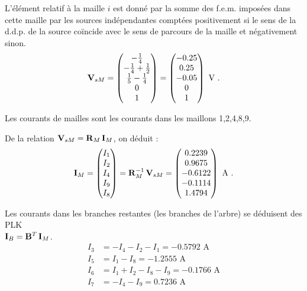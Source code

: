 
L'élément
relatif à la maille $i$ est donné par la somme des f.e.m.  imposées
dans cette maille par les sources indépendantes comptées positivement si le
sens de la d.d.p. de la source coïncide avec le sens de parcours de la
maille  et négativement sinon.
\[{\bf V}_{sM}=
\begin{pmatrix}
-\frac{1}{4}\\
-\frac{1}{4}+\frac{1}{2}\\
\frac{1}{5}-\frac{1}{4}\\
0\\
1
\end{pmatrix} =
\begin{pmatrix}
-0.25 \\ 0.25 \\ -0.05 \\ 0 \\ 1
\end{pmatrix}\text{~V~.}
\]

Les courants de mailles sont les courants dans les maillons
1,2,4,8,9.


De la relation ${\bf V}_{sM}={\bf R}_M\, {\bf I}_M$, on déduit :
\[{\bf I}_M=\begin{pmatrix}
I_1\\ I_2\\I_4\\I_9\\I_8
\end{pmatrix}= {\bf R}_M^{-1}\, {\bf V}_{sM}=
\begin{pmatrix}
0.2239\\ 0.9675\\-0.6122\\-0.1114\\1.4794
\end{pmatrix}\text{~A~.}\]


Les courants dans les branches restantes (les branches de l'arbre) se
déduisent des PLK \\${\bf I}_B={\bf B}^T\, {\bf I}_M$.
\begin{align*}
I_3 & = -I_4-I_2-I_1=-0.5792 \text{~A}\\
I_5 & = I_1-I_8=-1.2555 \text{~A}\\
I_6 & = I_1+I_2-I_8-I_9=-0.1766 \text{~A}\\
I_7 & = -I_4-I_9= 0.7236 \text{~A}
\end{align*}

